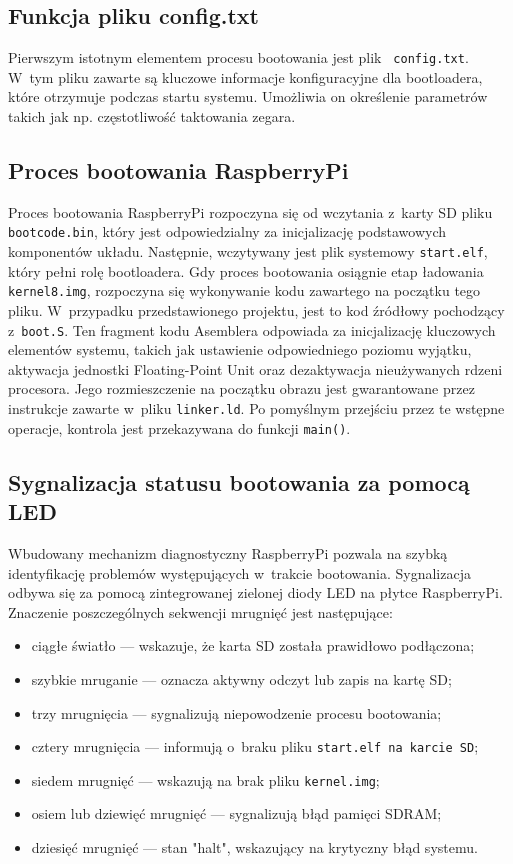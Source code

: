\documentclass[shortabstract]{iithesis}
\begin{document}
\subsection{Funkcja pliku config.txt}
Pierwszym istotnym elementem procesu bootowania jest plik \texttt{ config.txt}. W~tym pliku zawarte są kluczowe informacje konfiguracyjne dla bootloadera, które otrzymuje podczas startu systemu. Umożliwia on określenie parametrów takich jak np. częstotliwość taktowania zegara. 
\subsection{Proces bootowania RaspberryPi}
Proces bootowania RaspberryPi rozpoczyna się od wczytania z~karty SD pliku \texttt{bootcode.bin}, który jest odpowiedzialny za inicjalizację podstawowych komponentów układu. Następnie, wczytywany jest plik systemowy \texttt{start.elf}, który pełni rolę bootloadera. Gdy proces bootowania osiągnie etap ładowania \texttt{kernel8.img}, rozpoczyna się wykonywanie kodu zawartego na początku tego pliku. W~przypadku przedstawionego projektu, jest to kod źródłowy pochodzący z~\texttt{boot.S}. Ten fragment kodu Asemblera odpowiada za inicjalizację kluczowych elementów systemu, takich jak ustawienie odpowiedniego poziomu wyjątku, aktywacja jednostki Floating-Point Unit oraz dezaktywacja nieużywanych rdzeni procesora. Jego rozmieszczenie na początku obrazu jest gwarantowane przez instrukcje zawarte w~pliku \texttt{linker.ld}. Po pomyślnym przejściu przez te wstępne operacje, kontrola jest przekazywana do funkcji \texttt{main()}.
\subsection{Sygnalizacja statusu bootowania za pomocą LED}
Wbudowany mechanizm diagnostyczny RaspberryPi pozwala na szybką identyfikację problemów występujących w~trakcie bootowania. Sygnalizacja odbywa się za pomocą zintegrowanej zielonej diody LED na płytce RaspberryPi. Znaczenie poszczególnych sekwencji mrugnięć jest następujące:
\begin{itemize}
 \item ciągłe światło --- wskazuje, że karta SD została prawidłowo podłączona;
 \item szybkie mruganie --- oznacza aktywny odczyt lub zapis na kartę SD;
 \item trzy mrugnięcia --- sygnalizują niepowodzenie procesu bootowania;
 \item cztery mrugnięcia --- informują o~braku pliku \texttt{start.elf na karcie SD};
 \item siedem mrugnięć --- wskazują na brak pliku \texttt{kernel.img};
 \item osiem lub dziewięć mrugnięć --- sygnalizują błąd pamięci SDRAM;
 \item dziesięć mrugnięć --- stan "halt", wskazujący na krytyczny błąd systemu.
\end{itemize}
\end{document}
